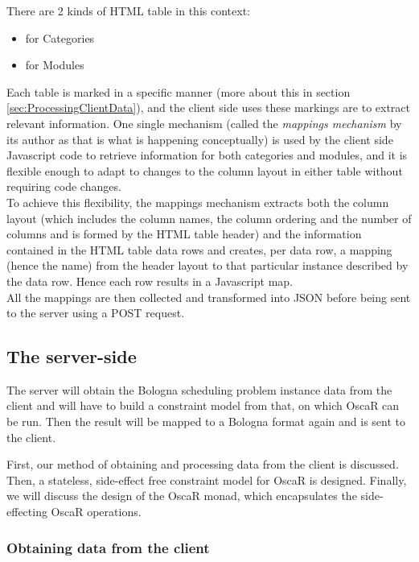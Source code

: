 \documentclass[a4paper]{article}
\begin{document}
There are 2 kinds of HTML table in this context:
\begin{itemize}
\item for Categories
\item for Modules
\end{itemize}

Each table is marked in a specific manner (more about this in section
\ref{sec:ProcessingClientData}), and the client side uses these
markings are to extract relevant information.
One single mechanism (called the \textit{mappings mechanism} by its
author as that is what is happening conceptually) is used by the
client side Javascript code to retrieve information for both
categories and modules, and it is flexible enough to adapt to changes
to the column layout in either table without requiring code changes.\\

To achieve this flexibility, the mappings mechanism extracts both the
column layout (which includes the column names, the column ordering
and the number of columns and is formed by the HTML table header) and
the information contained in the HTML table data rows and creates,
per data row, a mapping (hence the name) from the header layout to
that particular instance described by the data row. Hence each row
results in a Javascript map.\\

All the mappings are then collected and transformed into JSON before
being sent to the server using a POST request.


\subsection{The server-side}
\label{sec:design-server}
The server will obtain the Bologna scheduling problem instance data from the client
and will have to build a constraint model from that, on which OscaR can be run.
Then the result will be mapped to a Bologna format again and is sent to the client.

First, our method of obtaining and processing data from the client is discussed.
Then, a stateless, side-effect free constraint model for OscaR is designed.
Finally, we will discuss the design of the OscaR monad, 
which encapsulates the side-effecting OscaR operations.

\subsubsection{Obtaining data from the client}
\end{document}
